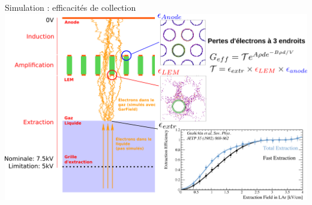     \begin{frame}{Simulation : efficacités de collection}
		\flushleft\includegraphics[width=\textwidth]{./pictures/coll_proba_2.png}
    \end{frame}
    
